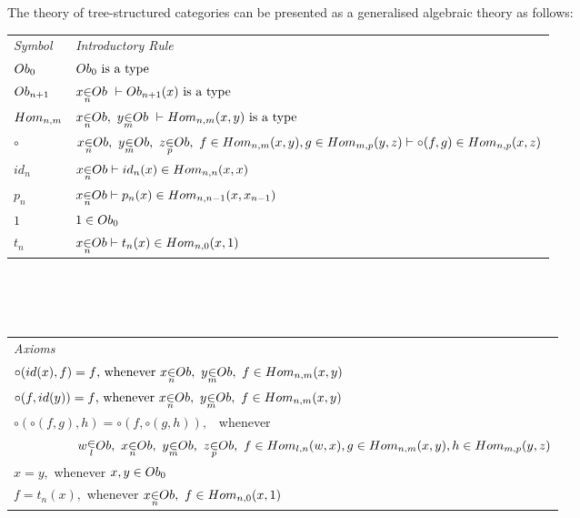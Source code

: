 \documentclass[10pt,a4paper]{article}
\begin{document}
\newcommand{\Obi}[1]{\Ob_{#1}}
\newcommand{\Homij}[2]{\Hom_{#1,#2}}
\newcommand{\ofObi}[2]{#1 \bbin{#2}{\Ob}}
\newcommand{\HomijBar}[4]{\Homij{#1}{#2}(#3,#4)}
\newcommand{\ofHomij}[5]{\ofT{#1}{\HomijBar{#2}{#3}{#4}{#5}}}
\newcommand{\HomijBarFt}[4]{\Homij{#1}{#2}(#3,\ft{#4})}
\newcommand{\ofHomiBarFt}[4]{\ofT{#1}{\HomijBarFt{#2}{#2-1}{#3}{#4}}}

\noindent The theory of tree-structured categories can be presented as a generalised algebraic theory as follows: \\
\vspace{0.03cm} 
\begin{tabular}{>{\itshape}l l}
Symbol & \itshape{Introductory Rule} \\[0.1cm]
$\Obi{0}  $&$\isT{\Obi{0}}$\\[0.2cm]
$\Obi{n+1} $&$\ofTn{x}{n}{\Ob} \    \tstyle \isT{\Obi{n+1}(x)} $\\ [0.25cm]
$\Homij{n}{m} $ &$\ofObi{x}{n} ,\  \ofObi{y}{m} \ \tstyle \isT{\HomijBar{n}{m}{x}{y}} $\\ [0.25cm]
$\circ$ & $\ofObi{x}{n}, \  \ofObi{y}{m}, \ \ofObi{z}{p}, \ \ofHomij{f}{n}{m}{x}{y},\ofHomij{g}{m}{p}{y}{z} \tstyle \ofHomij{\circ(f,g)}{n}{p}{x}{z}$ \\ [0.25cm]
$id_n   $   & $ \ofObi{x}{n} \tstyle \ofHomij{id_n(x)}{n}{n}{x}{x} $\\ [0.25cm]
$p_n   $   & $ \ofObi{x}{n} \tstyle \ofHomij{p_n(x)}{n}{n-1}{x}{x_{n-1}} $\\ [0.25cm]
$1     $   & $\ofT{1}\Obi{0} $\\         [0.25cm]
$t_n   $   & $ \ofObi{x}{n} \tstyle t_n(x) \in \Homij{n}{0}(x,1)$\\ [0.25cm]
\end{tabular} \\
\vspace{.1cm}  \\
\vspace{.03cm} \\
\begin{tabular}{l}
\itshape{Axioms} \\

$\circ(id(x),f)=f \mbox{,  whenever\ } \ofObi{x}{n} ,\  \ofObi{y}{m} , \ \ofHomij{f}{n}{m}{x}{y}  $\\ [0.25cm]
$\circ(f,id(y))=f \mbox{,  whenever\ } \ofObi{x}{n} ,\  \ofObi{y}{m} , \ \ofHomij{f}{n}{m}{x}{y}  $\\ [0.25cm]
$ \circ(\circ(f,g),h) = \circ(f,\circ(g,h)),$ \ whenever \\ [0.2cm]
$ \ \ \ \ \ \ \ \ \ \ \ \ \ \ \ 
\ofObi{w}{l} , \ \ofObi{x}{n} , \ \ofObi{y}{m} , \ \ofObi{z}{p}, \ 
 \ofHomij{f}{l}{n}{w}{x}, \ofHomij{g}{n}{m}{x}{y}, \ofHomij{h}{m}{p}{y}{z}$ \\ [0.25cm]
$x = y, $ whenever $x,y \in \Obi{0} $ \\ [0.25cm]
$f = t_n(x),  $ whenever $ \ofObi{x}{n}, \ f \in \Homij{n}{0}(x,1)$\\ [0.25cm]
\end{tabular}  \\
\end{document}
